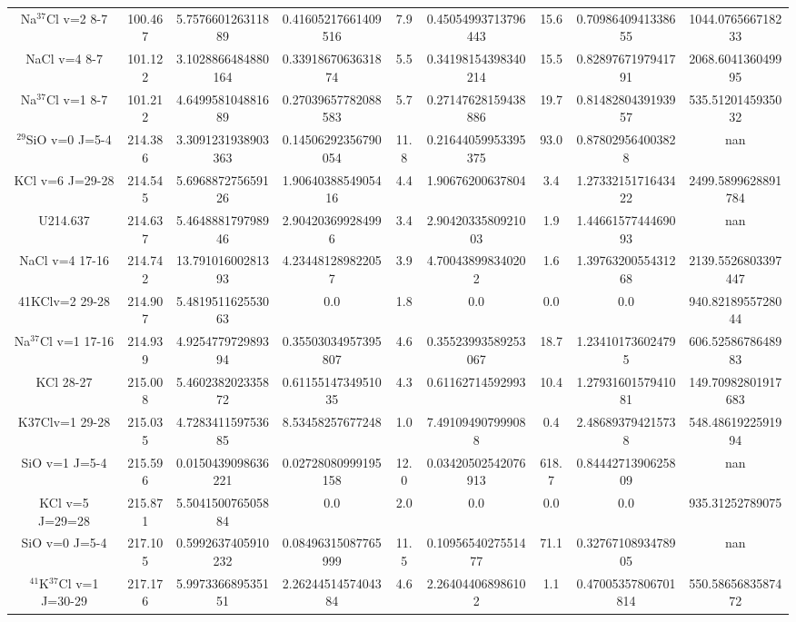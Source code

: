 \begin{table*}[htp]
\begin{tabular}{ccccccccc}
Na$^{37}$Cl v=2 8-7 & 100.467 & 5.757660126311889 & 0.41605217661409516 & 7.9 & 0.45054993713796443 & 15.6 & 0.7098640941338655 & 1044.076566718233 \\
NaCl v=4 8-7 & 101.122 & 3.1028866484880164 & 0.3391867063631874 & 5.5 & 0.34198154398340214 & 15.5 & 0.8289767197941791 & 2068.604136049995 \\
Na$^{37}$Cl v=1 8-7 & 101.212 & 4.649958104881689 & 0.27039657782088583 & 5.7 & 0.27147628159438886 & 19.7 & 0.8148280439193957 & 535.5120145935032 \\
$^{29}$SiO v=0 J=5-4 & 214.386 & 3.3091231938903363 & 0.14506292356790054 & 11.8 & 0.21644059953395375 & 93.0 & 0.878029564003828 & nan \\
KCl v=6 J=29-28 & 214.545 & 5.696887275659126 & 1.9064038854905416 & 4.4 & 1.90676200637804 & 3.4 & 1.2733215171643422 & 2499.5899628891784 \\
U214.637 & 214.637 & 5.464888179798946 & 2.904203699284996 & 3.4 & 2.9042033580921003 & 1.9 & 1.4466157744469093 & nan \\
NaCl v=4 17-16 & 214.742 & 13.79101600281393 & 4.234481289822057 & 3.9 & 4.700438998340202 & 1.6 & 1.3976320055431268 & 2139.5526803397447 \\
41KClv=2 29-28 & 214.907 & 5.481951162553063 & 0.0 & 1.8 & 0.0 & 0.0 & 0.0 & 940.8218955728044 \\
Na$^{37}$Cl v=1 17-16 & 214.939 & 4.925477972989394 & 0.35503034957395807 & 4.6 & 0.35523993589253067 & 18.7 & 1.234101736024795 & 606.5258678648983 \\
KCl 28-27 & 215.008 & 5.460238202335872 & 0.6115514734951035 & 4.3 & 0.61162714592993 & 10.4 & 1.2793160157941081 & 149.70982801917683 \\
K37Clv=1 29-28 & 215.035 & 4.728341159753685 & 8.53458257677248 & 1.0 & 7.491094907999088 & 0.4 & 2.486893794215738 & 548.4861922591994 \\
SiO v=1 J=5-4 & 215.596 & 0.0150439098636221 & 0.02728080999195158 & 12.0 & 0.03420502542076913 & 618.7 & 0.8444271390625809 & nan \\
KCl v=5 J=29=28 & 215.871 & 5.504150076505884 & 0.0 & 2.0 & 0.0 & 0.0 & 0.0 & 935.31252789075 \\
SiO v=0 J=5-4 & 217.105 & 0.5992637405910232 & 0.08496315087765999 & 11.5 & 0.1095654027551477 & 71.1 & 0.3276710893478905 & nan \\
$^{41}$K$^{37}$Cl v=1 J=30-29 & 217.176 & 5.997336689535151 & 2.2624451457404384 & 4.6 & 2.264044068986102 & 1.1 & 0.47005357806701814 & 550.5865683587472 \\

\end{tabular}
\end{table*}
